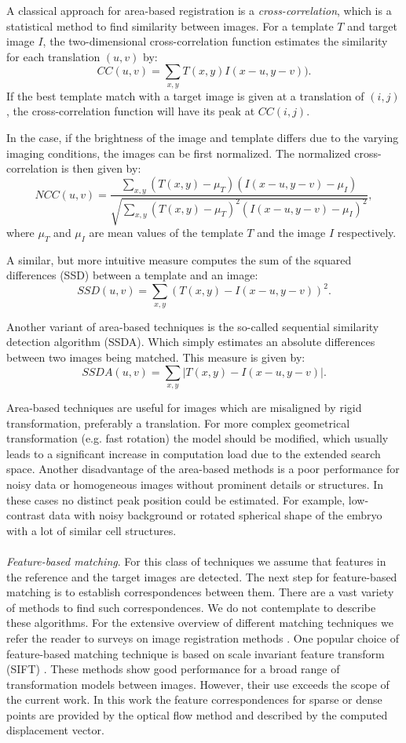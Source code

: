 A classical approach for area-based registration is a \textit{cross-correlation}, which is a statistical method to find similarity between images.  For a template $T$ and target image $I$, the two-dimensional cross-correlation function estimates the similarity for each translation $(u,v)$ by:
$$ CC(u,v) = \sum_{x,y} T(x,y) I(x-u, y-v)). $$
If the best template match with a target image is given at a translation of $(i,j)$, the cross-correlation function will have its peak at $CC(i,j)$.

In the case, if the brightness of the image and template differs due to the varying  imaging conditions, the images can be first normalized. The normalized cross-correlation is then given by:
$$NCC(u,v) = \frac{\sum_{x,y} (T(x,y) - \mu_T) (I(x-u, y-v) - \mu_I)}{\sqrt{\sum_{x,y} (T(x,y) - \mu_T)^2 (I(x-u, y-v) - \mu_I)^2}}, $$
where $\mu_T$ and $\mu_I$ are mean values of the template $T$ and the image $I$ respectively.  

A similar, but more intuitive measure computes the sum of the squared differences (SSD) between a template and an image:
$$SSD(u,v) = \sum_{x,y} (T(x,y) - I(x-u, y-v))^2.$$

Another variant of area-based techniques is the so-called sequential similarity detection algorithm (SSDA). Which simply estimates an absolute differences between two images being matched.
This measure is given by:
$$SSDA(u,v) = \sum_{x,y} |T(x,y) - I(x-u, y-v)|.$$


Area-based techniques are useful for images which are misaligned by rigid transformation, preferably a translation. For more complex geometrical transformation (e.g. fast rotation) the model should be modified, which usually leads to a significant increase in computation load due to the extended search space. Another disadvantage of the area-based methods is a poor performance for noisy data or homogeneous images  without prominent details or structures. In these cases no distinct peak position could be estimated. For example, low-contrast data with noisy background or rotated spherical shape of the embryo with a lot of similar cell structures.
\\
\\
\textit{Feature-based matching}. For this class of techniques we assume that features in the reference and the target images are detected. The next step for feature-based matching is to establish correspondences between them.
There are a vast variety of methods to find such correspondences. We do not contemplate to describe  these algorithms. For the extensive overview of different matching techniques we refer the reader to surveys on image registration methods \cite{Brown92, Zitova03}.
One popular choice of feature-based matching technique is based on scale invariant feature transform (SIFT) \cite{Lowe04}. These methods show good performance for a broad range of transformation models between images. However, their use exceeds the scope of the current work.
In this work the feature correspondences for sparse or dense points are provided by the optical flow method and described by the computed displacement vector.


